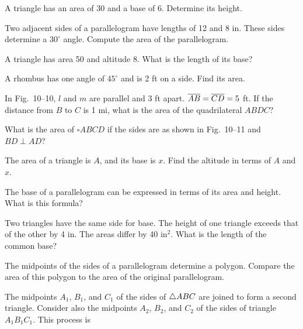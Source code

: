 \documentclass[11pt]{book}
\newcommand{\Xrect}{\ensuremath{\square}}
\begin{document}
\begin{exercisecols}
\begin{exlist}
\item A triangle has an area of 30 and a base of 6. Determine its height.
\item Two adjacent sides of a parallelogram have lengths of 12 and 8 in. These
  sides determine a $30^\circ$ angle. Compute the area of the parallelogram.
\item A triangle has area 50 and altitude 8. What is the length of its base?
\item A rhombus has one angle of $45^\circ$ and is 2 ft on a side. Find its
  area.
\item In Fig.~10--10, $l$ and $m$ are parallel and 3 ft apart.
  $\overline{AB} = \overline{CD} = 5$ ft. If the distance from $B$ to $C$ is 1 mi, what is
  the area of the quadrilateral $ABDC$?
\exfig{\FIGXTEN}
\item What is the area of $\Xrect ABCD$ if the sides are as shown in
  Fig.~10--11 and $BD \perp AD$?
\exfig{\FIGXELEVEN}
\item The area of a triangle is $A$, and its base is $x$. Find the altitude in
  terms of $A$ and $x$.
\item The base of a parallelogram can be expressed in terms of its area and
  height. What is this formula?
\item Two triangles have the same side for base. The height of one triangle
  exceeds that of the other by 4 in. The areas differ by 40 in$^2$. What is the
  length of the common base?
\item The midpoints of the sides of a parallelogram determine a polygon.
  Compare the area of this polygon to the area of the original parallelogram.
\item[\stex 11.] The midpoints $A_1$, $B_1$, and $C_1$ of the sides of
  $\triangle ABC$ are joined to form a second triangle. Consider also the midpoints
  $A_2$, $B_2$, and $C_2$ of the sides of triangle $A_1B_1C_1$. This process is

\end{exlist}
\end{exercisecols}
\end{document}

